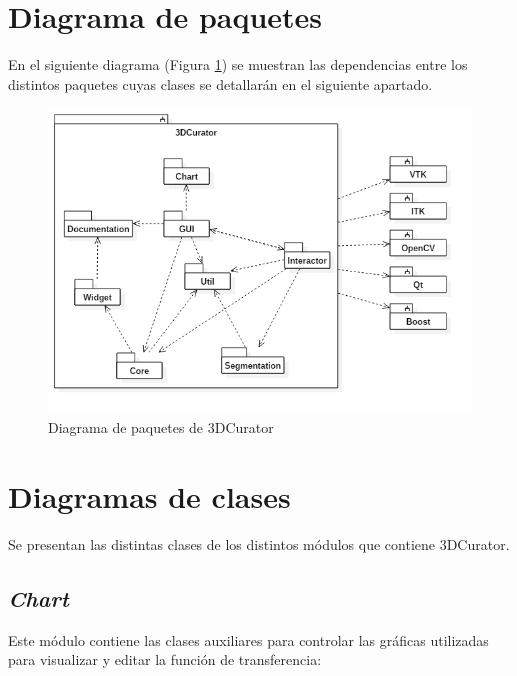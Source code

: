 \section{Diagrama de paquetes}

En el siguiente diagrama (Figura \ref{fig:diseno/package}) se muestran las dependencias entre los distintos paquetes cuyas clases se detallarán en el siguiente apartado.

\begin{figure}[H]
	\centering
	\includegraphics[width=12cm]{imagenes/diseno/package}
	\caption{Diagrama de paquetes de 3DCurator}
	\label{fig:diseno/package}
\end{figure}

\section{Diagramas de clases}

Se presentan las distintas clases de los distintos módulos que contiene 3DCurator.

\subsection{\textit{Chart}}

Este módulo contiene las clases auxiliares para controlar las gráficas utilizadas para visualizar y editar la función de transferencia:


